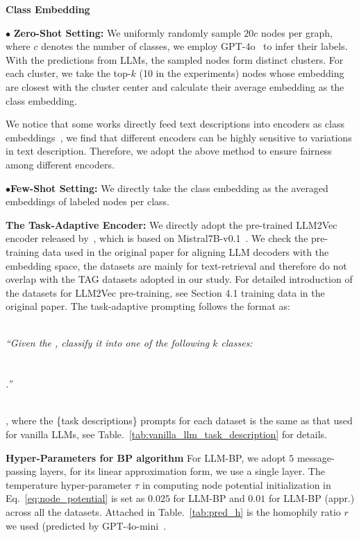 \textbf{Class Embedding}

$\bullet$ \textbf{Zero-Shot Setting:} We uniformly randomly sample $20 c$ nodes per graph, where $c$ denotes the number of classes, we employ GPT-4o~\cite{hurst2024gpt} to infer their labels. With the predictions from LLMs, the sampled nodes form distinct clusters. For each cluster, we take the top-$k$ (10 in the experiments) nodes whose embedding are closest with the cluster center and calculate their average embedding as the class embedding.

We notice that some works directly feed text descriptions into encoders as class embeddings~\cite{yang2024gl, chen2024text}, we find that different encoders can be highly sensitive to variations in text description. Therefore, we adopt the above method to ensure fairness among different encoders.


$\bullet$\textbf{Few-Shot Setting:} We directly take the class embedding as the averaged embeddings of labeled nodes per class.


\textbf{The Task-Adaptive Encoder:} We directly adopt the pre-trained LLM2Vec encoder released by~\cite{li2024making}, which is based on Mistral7B-v0.1~\cite{jiang2023mistral}. We check the pre-training data used in the original paper for aligning LLM decoders with the embedding space, the datasets are mainly for text-retrieval and therefore do not overlap with the TAG datasets adopted in our study. For detailed introduction of the datasets for LLM2Vec pre-training, see Section 4.1 training data in the original paper.
\label{sec:app_task_adaptive_implementation}
The task-adaptive prompting follows the format as:

\textit{
\\
``Given the , classify it into one of the following $k$ classes: \\
\\
\\
.''\\
\\}


, where the \{task descriptions\} prompts for each dataset is the same as that used for vanilla LLMs, see Table.~\ref{tab:vanilla_llm_task_description} for details. 


\textbf{Hyper-Parameters for BP algorithm}
For LLM-BP, we adopt $5$ message-passing layers, for its linear approximation form, we use a single layer.
The temperature hyper-parameter $\tau$ in computing node potential initialization in Eq.~\eqref{eq:node_potential} is set as $0.025$ for LLM-BP and $0.01$ for LLM-BP (appr.) across all the datasets. Attached in Table.~\ref{tab:pred_h} is the homophily ratio $r$ we used (predicted by GPT-4o-mini~\cite{hurst2024gpt}.




